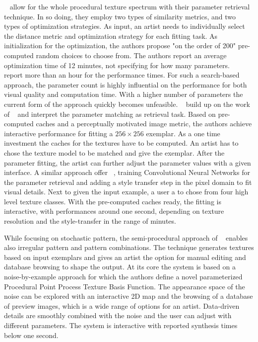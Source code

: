\citeauthor*{bourque_2004_ptm}~\cite{bourque_2004_ptm} allow for the whole procedural texture spectrum with their parameter retrieval technique. In so doing, they employ two types of similarity metrics, and two types of optimization strategies. As input, an artist needs to individually select the distance metric and optimization strategy for each fitting task. As initialization for the optimization, the authors propose "on the order of 200" pre-computed random choices to choose from. The authors report an average optimization time of 12 minutes, not specifying for how many parameters. \citeauthor*{gilet_2012_mkn}~\cite{gilet_2012_mkn} report more than an hour for the performance times. For such a search-based approach, the parameter count is highly influential on the performance for both visual quality and computation time. With a higher number of parameters the current form of the approach quickly becomes unfeasible. \citeauthor*{gieseke_2014_ipr}~\cite{gieseke_2014_ipr} build up on the work of \citeauthor*{bourque_2004_ptm}~\cite{bourque_2004_ptm} and interpret the parameter matching as retrieval task. Based on pre-computed caches and a perceptually motivated image metric, the authors achieve interactive performance for fitting a $256\times256$ exemplar. As a one time investment the caches for the textures have to be computed. An artist has to chose the texture model to be matched and give the exemplar. After the parameter fitting, the artist can further adjust the parameter values with a given interface. A similar approach offer \citeauthor*{hu_2019_anf}~\cite{hu_2019_anf}, training Convolutional Neural Networks for the parameter retrieval and adding a style transfer step in the pixel domain to fit visual details. Next to given the input example, a user a to chose from four high level texture classes. With the pre-computed caches ready, the fitting is interactive, with performances around one second, depending on texture resolution and the style-transfer in the range of minutes.

While focusing on stochastic pattern, the semi-procedural approach of \citeauthor*{guehl_2020_stu}~\cite{guehl_2020_stu} enables also irregular pattern and pattern combinations. The technique
generates textures based on input exemplars and gives an artist the option for manual editing and database browsing to shape the output. At its core the system is based on a noise-by-example approach for which the authors define a novel parameterized Procedural Point Process Texture Basis Function. The appearance space of the noise can be explored with an interactive 2D map and the browsing of a database of preview images, which is a wide range of options for an artist. Data-driven details are smoothly combined with the noise and the user can adjust with different parameters. The system is interactive with reported synthesis times below one second.


